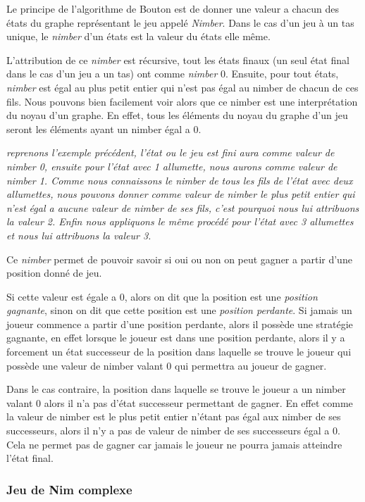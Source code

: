     Le principe de l'algorithme de Bouton est de donner une valeur a chacun des états du graphe représentant le jeu appelé \textit{Nimber}. Dans le cas d'un jeu \`a un tas unique, le \textit{nimber} d'un états est la valeur du états elle même.

    L'attribution de ce \textit{nimber} est récursive, tout les états finaux (un seul état final dans le cas d'un jeu a un tas) ont comme \textit{nimber} 0. Ensuite, pour tout états, \textit{nimber} est égal au plus petit entier qui n'est pas égal au nimber de chacun de ces fils. Nous pouvons bien facilement voir alors que ce nimber est une interprétation du noyau d'un graphe. En effet, tous les éléments du noyau du graphe d'un jeu seront les éléments ayant un nimber égal a 0.

    \textit {
    reprenons l'exemple précédent, l’état ou le jeu est fini aura comme valeur de nimber 0, ensuite pour l’état avec 1 allumette, nous aurons comme valeur de nimber 1. Comme nous connaissons le nimber de tous les fils de l’état avec deux allumettes, nous pouvons donner comme valeur de nimber le plus petit entier qui n'est égal a aucune valeur de nimber de ses fils, c'est pourquoi nous lui attribuons la valeur 2. Enfin nous appliquons le même procédé pour l’état avec 3 allumettes et nous lui attribuons la valeur 3.
    }

    Ce \textit{nimber} permet de pouvoir savoir si oui ou non on peut gagner a partir d'une position donné de jeu.

    Si cette valeur est égale a 0, alors on dit que la position est une \textit{position gagnante}, sinon on dit que cette position est une \textit{position perdante}. Si jamais un joueur commence a partir d'une position perdante, alors il possède une stratégie gagnante, en effet lorsque le joueur est dans une position perdante, alors il y a forcement un état successeur de la position dans laquelle se trouve le joueur qui possède une valeur de nimber valant 0 qui permettra au joueur de gagner.

    Dans le cas contraire, la position dans laquelle se trouve le joueur a un nimber valant 0 alors il n'a pas d’état successeur permettant de gagner. En effet comme la valeur de nimber est le plus petit entier n’étant pas égal aux nimber de ses successeurs, alors il n'y a pas de valeur de nimber de ses successeurs égal a 0. Cela ne permet pas de gagner car jamais le joueur ne pourra jamais atteindre l’état final.

  \subsubsection{Jeu de Nim complexe}
  \label{subsub:Jeu de Nim complexe}

